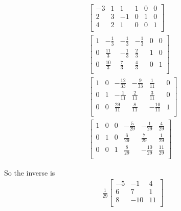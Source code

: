 \documentclass[a4paper]{article}
\begin{document}
\begin{align}
	\left[	
	\begin{array}{ccc|ccc}
		-3 & 1 & 1 & 1 & 0 & 0 \\
		2 & 3 & -1 & 0 & 1 & 0 \\
		4 & 2 & 1 & 0 & 0 & 1 \\
	\end{array}
	\right] \\
	\left[	
	\begin{array}{ccc|ccc}
		1 & -\frac{1}{3} & -\frac{1}{3} & -\frac{1}{3} & 0 & 0 \\
		0 & \frac{11}{3} & -\frac{1}{3} & \frac{2}{3} & 1 & 0 \\
		0 & \frac{10}{3} & \frac{7}{3} & \frac{4}{3} & 0 & 1 \\
	\end{array}
	\right] \\
	\left[	
	\begin{array}{ccc|ccc}
		1 & 0 & -\frac{12}{33} & -\frac{9}{33} & \frac{1}{11} & 0 \\
		0 & 1 & -\frac{1}{11} & \frac{2}{11} & \frac{3}{11} & 0 \\
		0 & 0 & \frac{29}{11} & \frac{8}{11} & -\frac{10}{11} & 1 \\
	\end{array}
	\right] \\
	\left[	
	\begin{array}{ccc|ccc}
		1 & 0 & 0 & -\frac{5}{29} & -\frac{1}{29} & \frac{4}{29} \\
		0 & 1 & 0 & \frac{6}{29} & \frac{7}{29} & \frac{1}{29} \\
		0 & 0 & 1 & \frac{8}{29} & -\frac{10}{29} & \frac{11}{29} \\
	\end{array}
	\right]
\end{align}

So the inverse is
\begin{align*}
	\frac{1}{29} \left[
	\begin{matrix}
		-5 & -1 & 4 \\
		6 & 7 & 1\\
		8 & -10 & 11\\
	\end{matrix}
	\right]
\end{align*}
\end{document}

